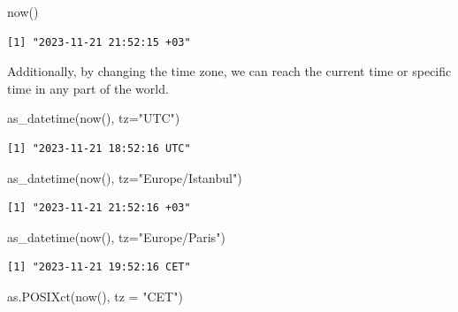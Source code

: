 \documentclass[
  letterpaper,
  DIV=11,
  numbers=noendperiod]{scrartcl}
\newenvironment{Shaded}{\begin{snugshade}}{\end{snugshade}}
\newcommand{\AttributeTok}[1]{\textcolor[rgb]{0.40,0.45,0.13}{#1}}
\newcommand{\FunctionTok}[1]{\textcolor[rgb]{0.28,0.35,0.67}{#1}}
\newcommand{\NormalTok}[1]{\textcolor[rgb]{0.00,0.23,0.31}{#1}}
\newcommand{\StringTok}[1]{\textcolor[rgb]{0.13,0.47,0.30}{#1}}
\begin{document}
\begin{Shaded}
\begin{Highlighting}[]
\FunctionTok{now}\NormalTok{()}
\end{Highlighting}
\end{Shaded}

\begin{verbatim}
[1] "2023-11-21 21:52:15 +03"
\end{verbatim}

Additionally, by changing the time zone, we can reach the current time
or specific time in any part of the world.

\begin{Shaded}
\begin{Highlighting}[]
\FunctionTok{as\_datetime}\NormalTok{(}\FunctionTok{now}\NormalTok{(), }\AttributeTok{tz=}\StringTok{"UTC"}\NormalTok{) }
\end{Highlighting}
\end{Shaded}

\begin{verbatim}
[1] "2023-11-21 18:52:16 UTC"
\end{verbatim}

\begin{Shaded}
\begin{Highlighting}[]
\FunctionTok{as\_datetime}\NormalTok{(}\FunctionTok{now}\NormalTok{(), }\AttributeTok{tz=}\StringTok{"Europe/Istanbul"}\NormalTok{) }
\end{Highlighting}
\end{Shaded}

\begin{verbatim}
[1] "2023-11-21 21:52:16 +03"
\end{verbatim}

\begin{Shaded}
\begin{Highlighting}[]
\FunctionTok{as\_datetime}\NormalTok{(}\FunctionTok{now}\NormalTok{(), }\AttributeTok{tz=}\StringTok{"Europe/Paris"}\NormalTok{) }
\end{Highlighting}
\end{Shaded}

\begin{verbatim}
[1] "2023-11-21 19:52:16 CET"
\end{verbatim}

\begin{Shaded}
\begin{Highlighting}[]
\FunctionTok{as.POSIXct}\NormalTok{(}\FunctionTok{now}\NormalTok{(), }\AttributeTok{tz =} \StringTok{"CET"}\NormalTok{) }
\end{Highlighting}
\end{Shaded}
\end{document}
